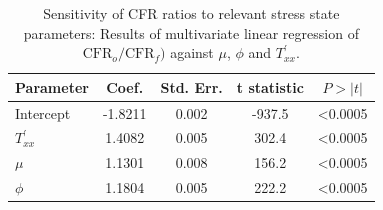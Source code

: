 \documentclass[draft,jgrga]{AGUTeX}
\begin{document}
\begin{table}[htb]
\centering
\begin{tabular}{l c c c c}
\hline
Parameter & Coef. & Std. Err. & t statistic & $P>|t|$ \\
\hline
Intercept & -1.8211 & 0.002 & -937.5 & \textless{}0.0005 \\ 
$T^\prime_{xx}$ & 1.4082 & 0.005 & 302.4 & \textless{}0.0005 \\ 
$\mu$ & 1.1301 & 0.008 & 156.2 & \textless{}0.0005 \\ 
$\phi$ & 1.1804 & 0.005 & 222.2 & \textless{}0.0005 \\ 
\hline
\end{tabular}
\caption{Sensitivity of CFR ratios to relevant stress state parameters:
Results of multivariate linear regression of
$\mathrm{CFR}_o/ \mathrm{CFR}_f)$ against $\mu$, $\phi$ and
$T^\prime_{xx}$.}
\label{table:cfr_regress}
\end{table}
\end{document}
